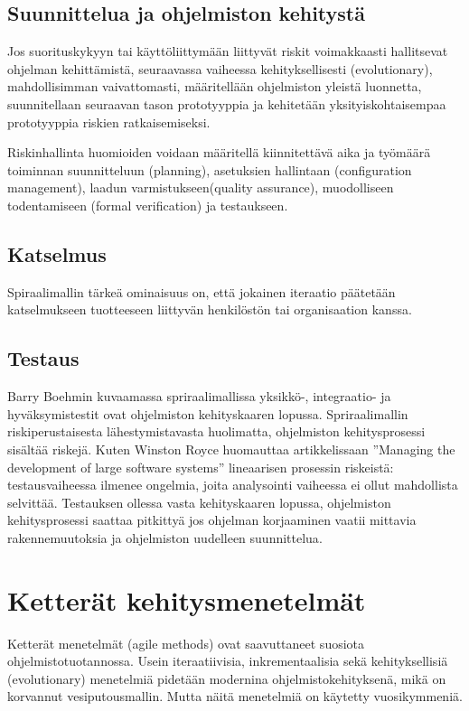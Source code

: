 \documentclass[finnish]{tktltiki2}
\theoremstyle{definition}
\theoremstyle{remark}
\begin{document}
\subsection*{Suunnittelua ja ohjelmiston kehitystä}

Jos suorituskykyyn tai käyttöliittymään liittyvät riskit voimakkaasti hallitsevat ohjelman kehittämistä, seuraavassa vaiheessa kehityksellisesti (evolutionary), mahdollisimman vaivattomasti, määritellään ohjelmiston yleistä luonnetta, suunnitellaan seuraavan tason prototyyppia ja kehitetään yksityiskohtaisempaa prototyyppia riskien ratkaisemiseksi\cite{BOE88}.

Riskinhallinta huomioiden voidaan määritellä kiinnitettävä aika ja työmäärä toiminnan suunnitteluun (planning), asetuksien hallintaan (configuration management), laadun varmistukseen(quality assurance), muodolliseen todentamiseen (formal verification) ja testaukseen\cite{BOE88}.

\subsection*{Katselmus}

Spiraalimallin tärkeä ominaisuus on, että jokainen iteraatio päätetään katselmukseen tuotteeseen liittyvän henkilöstön tai organisaation kanssa\cite{BOE88}.

\subsection*{Testaus}

Barry Boehmin kuvaamassa spriraalimallissa yksikkö-, integraatio- ja hyväksymis\-testit ovat ohjelmiston kehityskaaren lopussa. Spriraalimallin riskiperustaisesta lähestymistavasta huolimatta, ohjelmiston kehitysprosessi sisältää riskejä. Kuten Winston Royce huomauttaa artikkelissaan ''Managing the development of large software systems'' lineaarisen prosessin riskeistä: testausvaiheessa ilmenee ongelmia, joita analysointi vaiheessa ei ollut mahdollista selvittää. Testauksen ollessa vasta kehityskaaren lopussa, ohjelmiston kehitysprosessi saattaa pitkittyä jos ohjelman korjaaminen vaatii mittavia rakennemuutoksia ja ohjelmiston uudelleen suunnittelua\cite{ROY70}.

\section{Ketterät kehitysmenetelmät}

Ketterät menetelmät (agile methods) ovat saavuttaneet suosiota ohjelmistotuotannossa. Usein iteraatiivisia, inkrementaalisia sekä kehityksellisiä (evolutionary) menetelmiä pidetään modernina ohjelmistokehityksenä, mikä on korvannut vesiputousmallin. Mutta näitä menetelmiä on käytetty vuosikymmeniä\cite{LAB03}.
\end{document}
